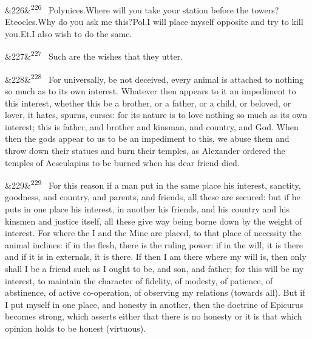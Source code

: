 \documentclass[12pt]{article}
\newcommand{\para}[1][]{\par\noindent\ifx&#1&\else\textsuperscript{\footnotesize #1}~\fi}
\begin{document}
\para[226] Polynices.Where will you take your station before the towers?Eteocles.Why do you ask me this?Pol.I will place myself opposite and try to kill you.Et.I also wish to do the same.

\para[227] Such are the wishes that they utter.

\para[228] For universally, be not deceived, every animal is attached to nothing so much as to its own interest. Whatever then appears to it an impediment to this interest, whether this be a brother, or a father, or a child, or beloved, or lover, it hates, spurns, curses: for its nature is to love nothing so much as its own interest; this is father, and brother and kinsman, and country, and God. When then the gods appear to us to be an impediment to this, we abuse them and throw down their statues and burn their temples, as Alexander ordered the temples of Aesculapius to be burned when his dear friend died.

\para[229] For this reason if a man put in the same place his interest, sanctity, goodness, and country, and parents, and friends, all these are secured: but if he puts in one place his interest, in another his friends, and his country and his kinsmen and justice itself, all these give way being borne down by the weight of interest. For where the I and the Mine are placed, to that place of necessity the animal inclines: if in the flesh, there is the ruling power: if in the will, it is there and if it is in externals, it is there. If then I am there where my will is, then only shall I be a friend such as I ought to be, and son, and father; for this will be my interest, to maintain the character of fidelity, of modesty, of patience, of abstinence, of active co-operation, of observing my relations (towards all). But if I put myself in one place, and honesty in another, then the doctrine of Epicurus becomes strong, which asserts either that there is no honesty or it is that which opinion holds to be honest (virtuous).
\end{document}
